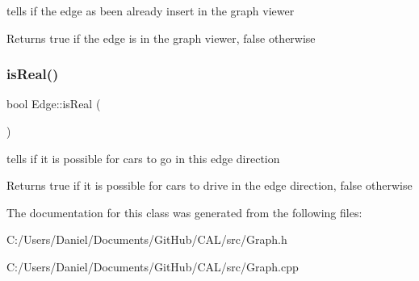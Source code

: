 tells if the edge as been already insert in the graph viewer 

\begin{DoxyReturn}{Returns}
true if the edge is in the graph viewer, false otherwise 
\end{DoxyReturn}
\hypertarget{class_edge_a10128890aff4f38cb7a992ce8c113255}{}\label{class_edge_a10128890aff4f38cb7a992ce8c113255} 
\subsubsection{\texorpdfstring{is\+Real()}{isReal()}}
{\footnotesize\ttfamily bool Edge\+::is\+Real (\begin{DoxyParamCaption}{ }\end{DoxyParamCaption})}



tells if it is possible for cars to go in this edge direction 

\begin{DoxyReturn}{Returns}
true if it is possible for cars to drive in the edge direction, false otherwise 
\end{DoxyReturn}


The documentation for this class was generated from the following files\+:\begin{DoxyCompactItemize}
\item 
C\+:/\+Users/\+Daniel/\+Documents/\+Git\+Hub/\+C\+A\+L/src/Graph.\+h\item 
C\+:/\+Users/\+Daniel/\+Documents/\+Git\+Hub/\+C\+A\+L/src/Graph.\+cpp\end{DoxyCompactItemize}
